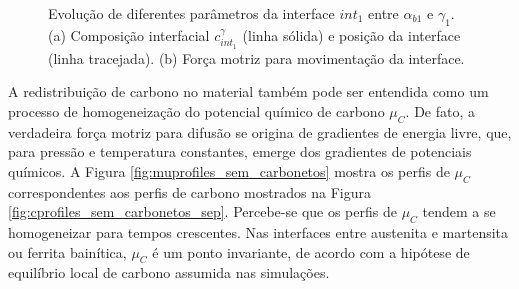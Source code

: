 \begin{figure}
  \quad
  \caption{Evolução de diferentes parâmetros da interface $int_1$ entre $\alpha_{b1}$ e $\gamma_1$. (a) Composição interfacial $c^\gamma_{int_1}$ (linha sólida) e posição da interface (linha tracejada). (b) Força motriz para movimentação da interface.}
  \label{fig:evolucao_interface_bainita}
\end{figure}

A redistribuição de carbono no material também pode ser entendida como um processo de homogeneização do potencial químico de carbono $\mu_C$. De fato, a verdadeira força motriz para difusão se origina de gradientes de energia livre, que, para pressão e temperatura constantes, emerge dos gradientes de potenciais químicos. A Figura \ref{fig:muprofiles_sem_carbonetos} mostra os perfis de $\mu_C$ correspondentes aos perfis de carbono mostrados na Figura \ref{fig:cprofiles_sem_carbonetos_sep}. Percebe-se que os perfis de $\mu_C$ tendem a se homogeneizar para tempos crescentes. Nas interfaces entre austenita e martensita ou ferrita bainítica, $\mu_C$ é um ponto invariante, de acordo com a hipótese de equilíbrio local de carbono assumida nas simulações.

